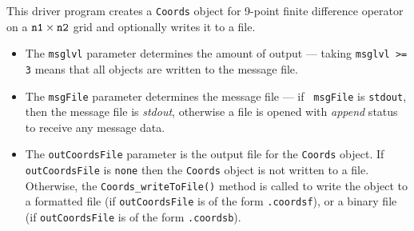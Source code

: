 \begin{enumerate}
\begin{verbatim}
\end{verbatim}
This driver program creates a {\tt Coords} object 
for 9-point finite difference operator on 
a $\mbox{\tt n1} \times \mbox{\tt n2}$ grid
and optionally writes it to a file.
\begin{itemize}
\item
The {\tt msglvl} parameter determines the amount of output ---
taking {\tt msglvl >= 3} means that all objects are written
to the message file.
\item
The {\tt msgFile} parameter determines the message file --- if {\tt
msgFile} is {\tt stdout}, then the message file is {\it stdout},
otherwise a file is opened with {\it append} status to receive any
message data.
\item
The {\tt outCoordsFile} parameter is the output file for the 
{\tt Coords} object. 
If {\tt outCoordsFile} is {\tt none} then the {\tt Coords} object 
is not written to a file. 
Otherwise, the {\tt Coords\_writeToFile()} method is called to write
the object to 
a formatted file (if {\tt outCoordsFile} 
is of the form {\tt *.coordsf}), or
a binary file (if {\tt outCoordsFile} is of the form {\tt *.coordsb}).
\end{itemize}
\end{enumerate}
